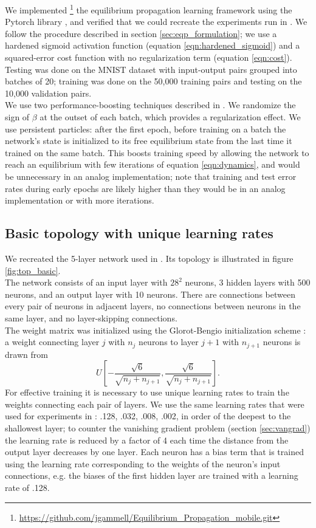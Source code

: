 \documentclass[format=sigconf]{acmart}
\newcommand{\npar}{\\\indent}
\begin{document}
We implemented
\footnote{\url{https://github.com/jgammell/Equilibrium_Propagation_mobile.git}}
 the equilibrium propagation learning framework \cite{scellier17} using the Pytorch library \cite{pytorch}, and verified that we could recreate the experiments run in \cite{scellier17}. We follow the procedure described in section \ref{sec:eqp_formulation}; we use a hardened sigmoid activation function (equation \ref{eqn:hardened_sigmoid}) and a squared-error cost function with no regularization term (equation \ref{eqn:cost}). Testing was done on the MNIST dataset \cite{mnist1998} with input-output pairs grouped into batches of 20; training was done on the 50,000 training pairs and testing on the 10,000 validation pairs.
\npar
We use two performance-boosting techniques described in \cite{scellier17}. We randomize the sign of $\beta$ at the outset of each batch, which provides a regularization effect. We use persistent particles: after the first epoch, before training on a batch the network's state is initialized to its free equilibrium state from the last time it trained on the same batch. This boosts training speed by allowing the network to reach an equilibrium with few iterations of equation \ref{eqn:dynamics}, and would be unnecessary in an analog implementation; note that training and test error rates during early epochs are likely higher than they would be in an analog implementation or with more iterations.

\subsection{Basic topology with unique learning rates}
\label{sec:basic_topology}

We recreated the 5-layer network used in \cite{scellier17}. Its topology is illustrated in figure \ref{fig:top_basic}.
\npar
The network consists of an input layer with $28^2$ neurons, 3 hidden layers with 500 neurons, and an output layer with 10 neurons. There are connections between every pair of neurons in adjacent layers, no connections between neurons in the same layer, and no layer-skipping connections.
\npar
The weight matrix was initialized using the Glorot-Bengio initialization scheme \cite{glorot2010}: a weight connecting layer $j$ with $n_j$ neurons to layer $j+1$ with $n_{j+1}$ neurons is drawn from 
\begin{equation}
\label{eqn:gb_init}
U[-\frac{\sqrt{6}}{\sqrt{n_j+n_{j+1}}},\frac{\sqrt{6}}{\sqrt{n_j+n_{j+1}}}].
\end{equation}
For effective training it is necessary to use unique learning rates to train the weights connecting each pair of layers. We use the same learning rates that were used for experiments in \cite{scellier17}: .128, .032, .008, .002, in order of the deepest to the shallowest layer; to counter the vanishing gradient problem (section \ref{sec:vangrad}) the learning rate is reduced by a factor of 4 each time the distance from the output layer decreases by one layer. Each neuron has a bias term that is trained using the learning rate corresponding to the weights of the neuron's input connections, e.g. the biases of the first hidden layer are trained with a learning rate of .128.
\end{document}
